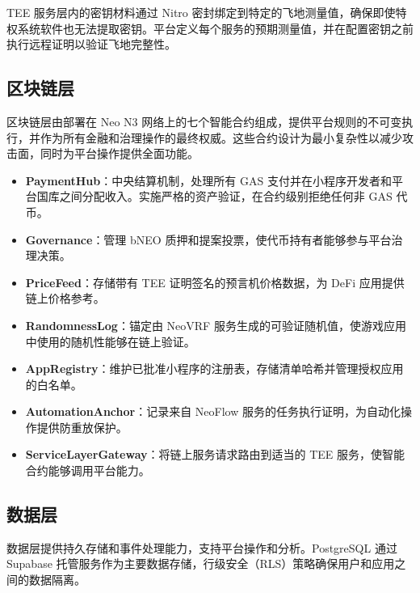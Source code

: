 \documentclass[11pt,a4paper]{article}
\begin{document}
TEE 服务层内的密钥材料通过 Nitro 密封绑定到特定的飞地测量值，确保即使特权系统软件也无法提取密钥。平台定义每个服务的预期测量值，并在配置密钥之前执行远程证明以验证飞地完整性。

\subsection{区块链层}

区块链层由部署在 Neo N3 网络上的七个智能合约组成，提供平台规则的不可变执行，并作为所有金融和治理操作的最终权威。这些合约设计为最小复杂性以减少攻击面，同时为平台操作提供全面功能。

\begin{itemize}
    \item \textbf{PaymentHub}：中央结算机制，处理所有 GAS 支付并在小程序开发者和平台国库之间分配收入。实施严格的资产验证，在合约级别拒绝任何非 GAS 代币。
    \item \textbf{Governance}：管理 bNEO 质押和提案投票，使代币持有者能够参与平台治理决策。
    \item \textbf{PriceFeed}：存储带有 TEE 证明签名的预言机价格数据，为 DeFi 应用提供链上价格参考。
    \item \textbf{RandomnessLog}：锚定由 NeoVRF 服务生成的可验证随机值，使游戏应用中使用的随机性能够在链上验证。
    \item \textbf{AppRegistry}：维护已批准小程序的注册表，存储清单哈希并管理授权应用的白名单。
    \item \textbf{AutomationAnchor}：记录来自 NeoFlow 服务的任务执行证明，为自动化操作提供防重放保护。
    \item \textbf{ServiceLayerGateway}：将链上服务请求路由到适当的 TEE 服务，使智能合约能够调用平台能力。
\end{itemize}

\subsection{数据层}

数据层提供持久存储和事件处理能力，支持平台操作和分析。PostgreSQL 通过 Supabase 托管服务作为主要数据存储，行级安全（RLS）策略确保用户和应用之间的数据隔离。
\end{document}
